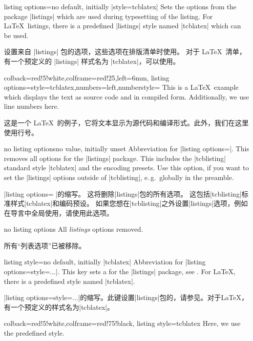 \begin{docTcbKey}{listing options}{=}{no default, initially |style=tcblatex|}
Sets the options from the package |listings| 
which are used during typesetting of the listing.
For \LaTeX\ listings, there is a predefined |listings| style named |tcblatex|
which can be used.

设置来自 |listings| 包的选项，这些选项在排版清单时使用。 对于 \LaTeX\ 清单，有一个预定义的 |listings| 样式名为 |tcblatex|，可以使用。
\begin{dispExample}
\begin{tcblisting}{colback=red!5!white,colframe=red!25,left=6mm,
listing options={style=tcblatex,numbers=left,numberstyle=\tiny\color{red!75!black}}}
This is a \LaTeX\ example which displays the text as source code
and in compiled form. Additionally, we use line numbers here.

这是一个 \LaTeX\ 的例子，它将文本显示为源代码和编译形式。此外，我们在这里使用行号。
\end{tcblisting}
\end{dispExample}
\end{docTcbKey}

\begin{docTcbKey}{no listing options}{}{no value, initially unset}
Abbreviation for |listing options={}|.
This removes all options for the |listings| package.
This includes the |tcblisting| standard style |tcblatex| and the encoding presets.
Use this option, if you want to set the |listings| options outside of |tcblisting|, e.\,g.\ globally in
the preamble.

|listing options={} |的缩写。 这将删除|listings|包的所有选项。 这包括|tcblisting|标准样式|tcblatex|和编码预设。 如果您想在|tcblisting|之外设置|listings|选项，例如在导言中全局使用，请使用此选项。
\begin{dispExample}
\begin{tcblisting}{no listing options}
All \textit{listings} options removed.

所有“列表选项”已被移除。
\end{tcblisting}
\end{dispExample}
\end{docTcbKey}


\begin{docTcbKey}{listing style}{=}{no default, initially |tcblatex|}
Abbreviation for |listing options={style=...}|. This key sets a 
for the |listings| package, see .
For \LaTeX, there is a predefined style named |tcblatex|.

|listing options={style=...}|的缩写。此键设置|listings|包的，请参见。对于\LaTeX，有一个预定义的样式名为|tcblatex|。
\begin{dispExample}
\begin{tcblisting}{colback=red!5!white,colframe=red!75!black,
listing style=tcblatex}
Here, we use the predefined style.
\end{tcblisting}
\end{dispExample}
\end{docTcbKey}

